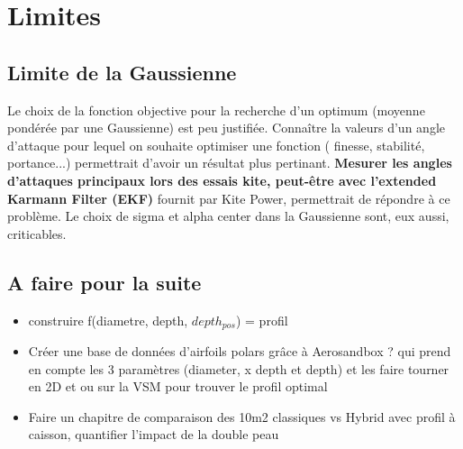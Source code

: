 
\chapter{Limites} 	
\label{Chapter5} 		


\section{Limite de la Gaussienne}
\label{sec:Ch4.1}

Le choix de la fonction objective pour la recherche d'un optimum (moyenne pondérée par une Gaussienne) est peu justifiée. Connaître la valeurs d'un angle d'attaque pour lequel on souhaite optimiser une fonction ( finesse, stabilité, portance...) permettrait d'avoir un résultat plus pertinant. \textbf{Mesurer les angles d'attaques principaux lors des essais kite, peut-être avec l'extended Karmann Filter (EKF)} fournit par Kite Power, permettrait de répondre à ce problème. Le choix de sigma et alpha center dans la Gaussienne sont, eux aussi, criticables.\\




\section{A faire pour la suite}
\label{sec:Ch4.2}

\begin{itemize}
    \item construire f(diametre, depth, $depth_{pos}$) = profil
    \item Créer une base de données d'airfoils polars grâce à Aerosandbox ? qui prend en compte les 3 paramètres (diameter, x depth et depth) et les faire tourner en 2D et ou sur la VSM pour trouver le profil optimal
    \item Faire un chapitre de comparaison des 10m2 classiques vs Hybrid avec profil à caisson, quantifier l'impact de la double peau
\end{itemize}